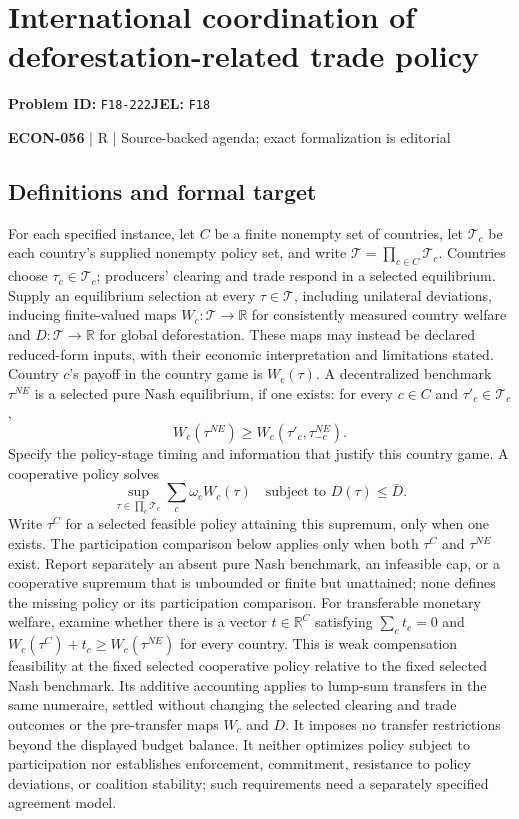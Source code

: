 \documentclass[11pt,a4paper]{article}
\newcommand{\R}{\mathbb R}
\begin{document}
\section*{International coordination of deforestation-related trade policy}
\textbf{Problem ID:} \texttt{F18-222}\quad \textbf{JEL:} \texttt{F18}\par
\label{problem:OP-0626}


\label{audited:ECON-056}

{\sffamily\small\color{muted}\textbf{ECON-056} | R | Source-backed agenda; exact formalization is editorial\par}

\subsection*{Definitions and formal target}

For each specified instance, let \(C\) be a finite nonempty set of countries, let \(\mathcal T_c\) be each country's supplied nonempty policy set, and write \(\mathcal T=\prod_{c\in C}\mathcal T_c\). Countries choose \(\tau_c\in\mathcal T_c\); producers' clearing and trade respond in a selected equilibrium. Supply an equilibrium selection at every \(\tau\in\mathcal T\), including unilateral deviations, inducing finite-valued maps \(W_c:\mathcal T\to\R\) for consistently measured country welfare and \(D:\mathcal T\to\R\) for global deforestation. These maps may instead be declared reduced-form inputs, with their economic interpretation and limitations stated. Country \(c\)'s payoff in the country game is \(W_c(\tau)\). A decentralized benchmark \(\tau^{NE}\) is a selected pure Nash equilibrium, if one exists: for every \(c\in C\) and \(\tau'_c\in\mathcal T_c\),
\[
 W_c(\tau^{NE})\geq W_c(\tau'_c,\tau^{NE}_{-c}).
\]
Specify the policy-stage timing and information that justify this country game. A cooperative policy solves
\[
 \sup_{\tau\in\prod_c\mathcal T_c}\sum_c\omega_cW_c(\tau)
 \quad\text{subject to }D(\tau)\leq\bar D .
\]
Write \(\tau^C\) for a selected feasible policy attaining this supremum, only when one exists. The participation comparison below applies only when both \(\tau^C\) and \(\tau^{NE}\) exist. Report separately an absent pure Nash benchmark, an infeasible cap, or a cooperative supremum that is unbounded or finite but unattained; none defines the missing policy or its participation comparison. For transferable monetary welfare, examine whether there is a vector \(t\in\R^{C}\) satisfying \(\sum_ct_c=0\) and \(W_c(\tau^C)+t_c\geq W_c(\tau^{NE})\) for every country. This is weak compensation feasibility at the fixed selected cooperative policy relative to the fixed selected Nash benchmark. Its additive accounting applies to lump-sum transfers in the same numeraire, settled without changing the selected clearing and trade outcomes or the pre-transfer maps \(W_c\) and \(D\). It imposes no transfer restrictions beyond the displayed budget balance. It neither optimizes policy subject to participation nor establishes enforcement, commitment, resistance to policy deviations, or coalition stability; such requirements need a separately specified agreement model.
\end{document}
